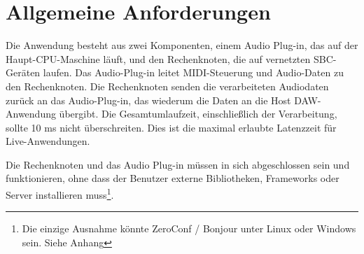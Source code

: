 \section{Allgemeine Anforderungen}

Die Anwendung besteht aus zwei Komponenten, einem Audio Plug-in, das auf der Haupt-CPU-Maschine läuft, und den Rechenknoten, die auf vernetzten SBC-Geräten laufen. Das Audio-Plug-in leitet MIDI-Steuerung und Audio-Daten zu den Rechenknoten. Die Rechenknoten senden die verarbeiteten Audiodaten zurück an das Audio-Plug-in, das wiederum die Daten an die Host DAW-Anwendung übergibt. Die Gesamtumlaufzeit, einschließlich der Verarbeitung, sollte 10 ms nicht überschreiten. Dies ist die maximal erlaubte Latenzzeit für Live-Anwendungen\cite{AES67-2013}.

Die Rechenknoten und das Audio Plug-in müssen in sich abgeschlossen sein und funktionieren, ohne dass der Benutzer externe Bibliotheken, Frameworks oder Server installieren muss\footnote{Die einzige Ausnahme könnte ZeroConf / Bonjour unter Linux oder Windows sein. Siehe Anhang}.
